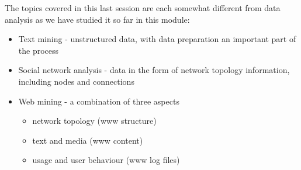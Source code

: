 




\graphicspath{ {../Common/images/} }

\graphicspath{ {images/} }


\title{}
\author{\vspace{3cm} Institute of Technology Tallaght}
\date{Department of Computing}
\maketitle
\newpage

The topics covered in this last session are each somewhat different from data analysis as we have studied it so far in this module:
\begin{itemize}
\item Text mining - unstructured data, with data preparation an important part of the process
\item Social network analysis - data in the form of network topology information, including nodes and connections
\item Web mining - a combination of three aspects
  \begin{itemize}
  \item network topology (www structure)
  \item text and media (www content)
  \item usage and user behaviour (www log files)
  \end{itemize}
\end{itemize}

\newpage

